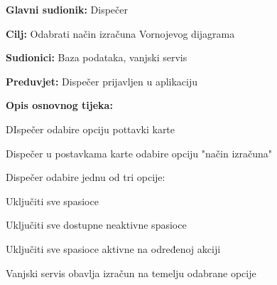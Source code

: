					\noindent {}
					\begin{packed_item}
	
						\item \textbf{Glavni sudionik: }\text Dispečer
						\item  \textbf{Cilj:} \text Odabrati način izračuna Vornojevog dijagrama
						\item  \textbf{Sudionici:} \text Baza podataka, vanjski servis
						\item  \textbf{Preduvjet:} \text Dispečer prijavljen u aplikaciju
						\item  \textbf{Opis osnovnog tijeka:}
						
						\item[] \begin{packed_enum}
							
							\item \text DIspečer odabire opciju pottavki karte
							\item \text Dispečer u postavkama karte odabire opciju "način izračuna"
							\item \text Dispečer odabire jednu od tri opcije:
								\begin{packed_enum}
									\item \text Uključiti sve spasioce
									\item \text Uključiti sve dostupne neaktivne spasioce
									\item \text Uključiti sve spasioce aktivne na određenoj akciji
								\end{packed_enum}
							\item \text Vanjski servis obavlja izračun na temelju odabrane opcije
						\end{packed_enum}
						
					\end{packed_item}	

